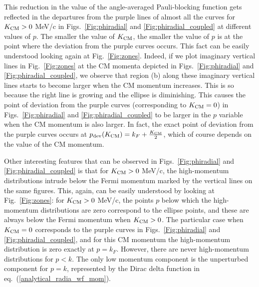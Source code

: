 \documentclass[aps,twocolumn,showpacs,preprintnumbers,amsmath,amssymb,nofootinbib,superscriptaddress,showkeys,noeprint]{revtex4-1}
\begin{document}
This reduction in the value of the angle-averaged Pauli-blocking
function gets reflected in the departures from the purple lines of
almost all the curves for $K_{\rm CM} > 0$ MeV/c in
Figs.~\ref{Fig:phiradial} and \ref{Fig:phiradial_coupled} at different
values of $p$.  The smaller the value of $K_{\rm CM}$, the smaller the
value of $p$ is at the point where the deviation from the purple
curves occurs.  This fact can be easily understood looking again at
Fig.~\ref{Fig:zones}.  Indeed, if we plot imaginary vertical lines in
Fig.~\ref{Fig:zones} at the CM momenta depicted in
Figs.~\ref{Fig:phiradial} and \ref{Fig:phiradial_coupled}, we observe
that region (b) along these imaginary vertical lines starts to become
larger when the CM momentum increases. This is so because the right
line is growing and the ellipse is diminishing.  This causes the point
of deviation from the purple curves (corresponding to $K_{\rm CM}=0$)
in Figs.~\ref{Fig:phiradial} and \ref{Fig:phiradial_coupled} to be
larger in the $p$ variable when the CM momentum is also larger.  In
fact, the exact point of deviation from the purple curves occurs at
$p_{\rm dev}(K_{\rm CM})=k_F + \frac{K_{\rm CM}}{2}$, which of course
depends on the value of the CM momentum.

Other interesting features that can be observed in
Figs.~\ref{Fig:phiradial} and \ref{Fig:phiradial_coupled} is that for
$K_{\rm CM} > 0$ MeV/c, the high-momentum distributions intrude below
the Fermi momentum marked by the vertical lines on the same
figures. This, again, can be easily understood by looking at
Fig.~\ref{Fig:zones}: for $K_{\rm CM} > 0$ MeV/c, the points $p$ below
which the high-momentum distributions are zero correspond to the
ellipse points, and these are always below the Fermi momentum when
$K_{\rm CM} > 0$.  The particular case when $K_{\rm CM} = 0$
corresponds to the purple curves in Figs.~\ref{Fig:phiradial} and
\ref{Fig:phiradial_coupled}, and for this CM momentum the
high-momentum distribution is zero exactly at $p=k_F$. However, there
are never high-momentum distributions for $p < k$. The only low
momentum component is the unperturbed component for $p=k$, represented
by the Dirac delta function in eq.~(\ref{analytical_radia_wf_mom}).
\end{document}
